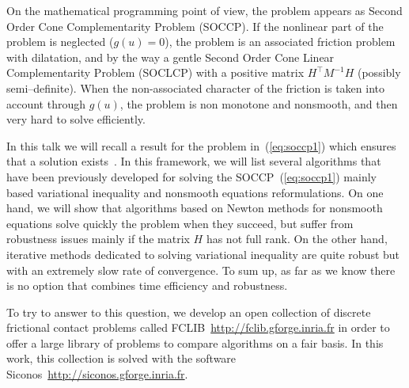 \documentclass[10pt,a4paper]{article}
\begin{document}
 On the mathematical programming point of view, the problem appears as Second Order Cone Complementarity Problem (SOCCP). If the nonlinear part of the problem is neglected ($g(u)=0$), the problem is an associated friction problem with dilatation, and by the way a gentle Second Order Cone Linear Complementarity Problem (SOCLCP) with a positive matrix $H^\top M^{-1} H$ (possibly semi--definite). When the non-associated character of the friction is taken into account through $g(u)$, the problem is non monotone and nonsmooth, and then very hard to solve efficiently.

In this talk we will recall a result for the problem in~(\ref{eq:soccp1}) which ensures that a solution exists~\cite{ZAMM:ZAMM201000073}. In this framework, we will list several algorithms that have been previously developed for solving the SOCCP~(\ref{eq:soccp1}) mainly based variational inequality and nonsmooth equations reformulations. On one hand, we will show that algorithms based on Newton methods for nonsmooth equations solve quickly the problem when they succeed, but suffer from robustness issues mainly if the matrix $H$ has not full rank. On the other hand, iterative methods dedicated to solving variational inequality are quite robust but with an extremely slow rate of convergence. To sum up, as far as we know there is no option that combines time efficiency and robustness. 

To try to answer to this question, we develop an open collection of discrete frictional contact problems called FCLIB~\url{http://fclib.gforge.inria.fr} in order to offer a large library of problems to compare algorithms on a fair basis.  In this work, this collection is solved with the software {\sc Siconos}~\url{http://siconos.gforge.inria.fr}.
\small


\end{document}
